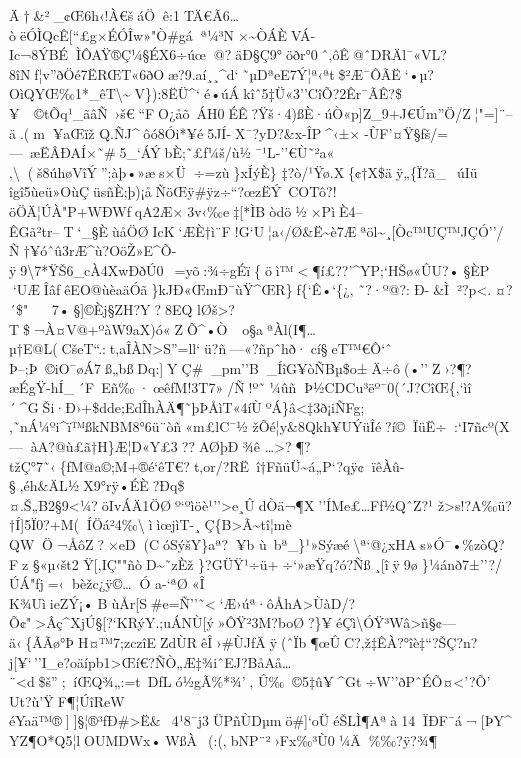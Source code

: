 Ä†\&²\_¢Œ6h‹!À€šáÖê:1TÄ€Ã6\ldots òëÓÌQcÊ{[}``£g×ÉÓÎw»"Ò\#gáª¼³N×\textasciitilde ÒÁÈVÁ-Ic¬8ÝBÉÌÔAŸ®Ç¼§ÉX6÷úœ@?\textquotesingleäÐ§Ç9°öðr°0ˆ‚ôÊ@ˆDRÄl¯«VL?8îNƒ¦v''ðÖé7ËRŒT«6ðOæ?9.aí¸¸\^{}d`˜µDªeE7Ý¦ª‹ªt\$²Æ¯ÔÃË`•µ\textbar{]}?OìQYŒ‰1*\_êT\textbackslash\textasciitildeV\}):8ËÜ\^{}`é•úÁkîˆ5‡Ü«3''CîÕ?2Êr¯ÃÊ?\$¥~©t Õq¹\_ãâÑ~›š€``FO¿åõ~ÁH0ÉÊ?Ÿš·4)ßÈ·úÒ«p{]}­Z\_9+J€Úm''Ö/Z¦"={]}¨--ä.(m¥aŒïž
Q.ÑJ\^{}ôó8Ói*¥é5JÍ-X¯?yD?\&x-ÎP\^{}‹±×-ÙF'¤Ÿ§ƒš/=---~æËÂÐAÍ×˜\#5\_`ÁÝbÈ;˜£f¼š/ù½¯¹L-''€Ù˜²a«
‚\textbackslash(š8úhø\textbar VîÝ'';àþ•»æs×Ü÷=zù\}xÍýÈ\}
‡?ò/¹Ÿ\textbar ø.X\{¢†X\$äÿ„\{Ï?ã\_~úIü
îgî5ùeü»OùÇ\textbar üsñÈ;þ)¡åÑöŒÿ\#ÿz÷``?œzËÝ~COTô?!öÖÄ¦ÚÀ"P+WÐWfqA2Æ×3v‹‰e­‡{[}*ÌBòdö½×PìÈ4--ÊGã²tr--T`\_§ÈùåÖØIcK`ÆÈ†ì¨F!G`U¦a‹/Ø\&Ë\textasciitilde è7Æªöl\textasciitilde¸{[}Òc™UÇ™JÇÓ''/Ñ†¥óˆû3rÆ\^{}ù?OöŽ»E\^{}Õ-ÿ9\textbackslash7*ŸŠ6\_cÀ4XwÐðÚ0~=yõ:¾÷gÉï\{öì™\textless¶í£??'\^{}YP;`HŠø«ÛU?•§ÈP\textbar{}
`UÆÎâƒêEO@ùèaäÓã\}kJÐ\textbar«ŒmÐ¯ùŸ\^{}ŒR\}ƒ\{` Ê•`\{¿‚
˜?·º@?:Ð-\&\textquotesingle Ì²?p\textless.¤?´\$"7•§{]}©Èj§ZH?Y?8EQ
lØš\textgreater?T\$¬À¤V@+ºàW9aX)ó«ZÕ\^{}•Ò~o§aªÀl(I¶\ldots µ†E@L(CšeT``.:t,aÎÀN\textgreater S''= l l`ü?ñ---«?ñpˆhð·cí§e T™€Ô`ˆ
Þ--;Þ©iO¯øÁ7ß„bßDq:{]}YÇ\#\_p\textbar m''B\_ÍîG¥òÑBµ\$o±Ä÷ô(•''Z›?¶?æÉgŸ-hÍ\_´F~Eñ‰·œêfM!3T7»/Ñ!º˜¼ûñÞ½CDCu³ëº¯0(´J?CîŒ\{‚`ìî´\^{}GŠi·Ð›+\$dde;EdÎhÀÄ¶˜þÞÅìT«4íÙºÁ\}â\textless‡3ð¡iÑFg\textbar;
,˜nÁ¼ºi\^{}ï™ßkNBM8°6ü¨òñ«m£lC¯½
žÕé¦y\&8Qkh¥UÝüÎé?í©ÏüË÷:`I7ñcº(X---àA?@ù£ã†H\}Æ¦D«Y£3??AØþÐ¾ê
\ldots\textgreater?¶?tžÇ°7˜‹ \{ƒM@a©;M+®é`êT€?t‚or/?RË~î†FñüÜ\textasciitilde á„P`?qÿ¢ïêÀû-§‚éh\&ÄL½X9°rÿ•ÉÈ?Ðq\$¤.Š„B2§9\textless¼?öIvÁÄ1ÖØº`ºìö è¹''\textgreater e¸ÛdÒ\textquotesingle ä¬¶X''ÍMe£\ldots Fƒ½QˆZ?¹ 
ž\textgreater s!?A‰ü?†Í{]}5Ï0?+M(ÍÖá²4‰\textbackslashììœjìT-¸Ç\{B\textgreater Ã\textasciitilde tî¦mè
QWÖ¬ÅôZ?×eD(CóSýšY\}aª?¥b
ù~bª\_\}¹»Sýæé\textbackslash ª`@¿xHAs»Ó¯•\%zòQ?Fz §«µ‹št2
Ÿ{[},IÇ""ñòD\textasciitilde˜zÈž
\}?GÜŸ¹÷ü+÷`»æŸq?ó?Ñß¸{[}î\textquotesingleÿ9ø\}¼ánð7±''?/ÚÁ"ƒj=‹bèžc¿ÿ©\ldotsÓ
a-`ªØ«Î
K¾UìieZÝ¡•BùÅr{[}S\#e=Ñ''˜\textless`Æ›úª·ôÅhA\textgreater ÙàD/?Õ¢"\textgreater Â ç\^{}XjÚ§{[}?{}`KRýY.;uÁNÙ{[}ý»ÔŸ²3M?boØ?\}¥éÇì\textbackslash ÓŸ³Wâ\textgreater ñ§¢---ä‹\{ÃÃø°ÞH¤™7;zczîEZdÙRêÎ›\#ÙJƒÄÿ(ˆÏb¶œÛC?‚ž‡ÊÀ?°îè‡``?ŠÇ?n?j{[}¥`\,''I\_e?oäípb1\textgreater Œí€?ÑÒ„Æ‡¾iˆEJ?BåAå\ldots¨\textless*d\$š'';íŒQ¾„:=t~DƒLó½gÃ\%*¾'‚
Û‰©5‡û¥\^{}Gt÷W''ðPˆÉÕ¤\textless'?Õ' Ut?­ù'­ŸF¶¦ÚîReW
éYaä™®{]}{]}§¦®³ƒÐ\#\textgreater Ë\&~4¹8¯j3ÜPñÙDµmö\#{]}`oÜéŠLÌ¶Aªà14ÏÐF¯á¬{[}ÞY\^{}YZ¶O*Q5¦lOUMDWx•WßÀ~(:(‚bNP¨²›Fx‰³Ù0¼Ä\%‰?ÿ?¾\textbar¶
